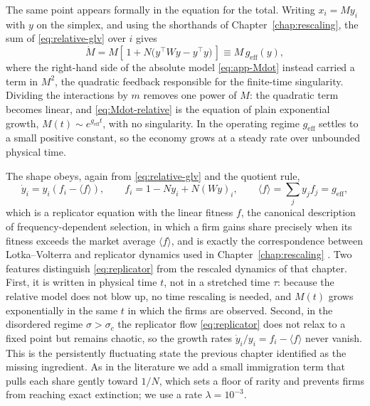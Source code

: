 The same point appears formally in the equation for the total. Writing $x_i = M y_i$
with $y$ on the simplex, and using the shorthands of Chapter~\ref{chap:rescaling}, the
sum of \eqref{eq:relative-glv} over $i$ gives
\begin{equation}
    \dot{M} = M \left[\, 1 + N\big( y^{\!\top} W y - y^{\!\top} y \big)\,\right]
            \equiv M\, g_{\mathrm{eff}}(y),
    \label{eq:Mdot-relative}
\end{equation}
where the right-hand side of the absolute model \eqref{eq:app-Mdot} instead carried a
term in $M^2$, the quadratic feedback responsible for the finite-time singularity.
Dividing the interactions by $m$ removes one power of $M$: the quadratic term becomes
linear, and \eqref{eq:Mdot-relative} is the equation of plain exponential growth,
$M(t) \sim e^{g_{\mathrm{eff}} t}$, with no singularity. In the operating regime
$g_{\mathrm{eff}}$ settles to a small positive constant, so the economy grows at a steady
rate over unbounded physical time.

The shape obeys, again from \eqref{eq:relative-glv} and the quotient rule,
\begin{equation}
    \dot{y}_i = y_i \left( f_i - \langle f \rangle \right),
    \qquad f_i = 1 - N y_i + N (Wy)_i,
    \qquad \langle f \rangle = \sum_j y_j f_j = g_{\mathrm{eff}},
    \label{eq:replicator}
\end{equation}
which is a replicator equation with the linear fitness $f$, the canonical description of
frequency-dependent selection, in which a firm gains share precisely when its fitness
exceeds the market average $\langle f \rangle$, and is exactly the correspondence between
Lotka--Volterra and replicator dynamics used in Chapter~\ref{chap:rescaling}
\citep{hofbauer81}. Two features distinguish
\eqref{eq:replicator} from the rescaled dynamics of that chapter. First, it is written
in physical time $t$, not in a stretched time $\tau$: because the relative model does
not blow up, no time rescaling is needed, and $M(t)$ grows exponentially in the same
$t$ in which the firms are observed. Second, in the disordered regime $\sigma > \sigma_c$
the replicator flow \eqref{eq:replicator} does not relax to a fixed point but remains
chaotic, so the growth rates $\dot y_i / y_i = f_i - \langle f\rangle$ never vanish.
This is the persistently fluctuating state the previous chapter identified as the
missing ingredient. As in the literature \citep{bunin2017,roy2020} we add a small
immigration term that pulls each share gently toward $1/N$, which sets a floor of rarity
and prevents firms from reaching exact extinction; we use a rate $\lambda = 10^{-3}$.

